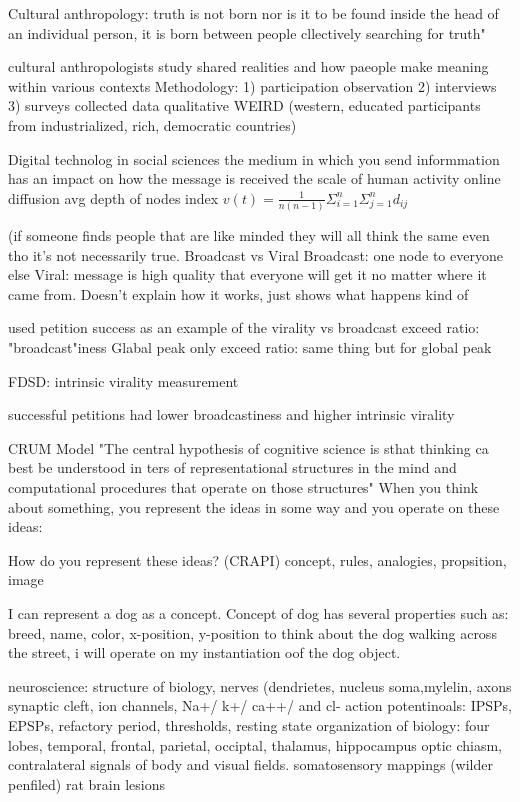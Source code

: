\documentclass{article}
\begin{document}
Cultural anthropology: truth is not born nor is it to be found inside the head of an individual person, it is born between people cllectively searching for truth" 

cultural anthropologists study shared realities and how paeople make meaning within various contexts
Methodology: 1) participation observation 2) interviews 3) surveys 
collected data qualitative
WEIRD (western, educated participants from industrialized, rich, democratic countries) 

Digital technolog in social sciences 
the medium in which you send informmation has an impact on how the message is received
the scale of human activity
online diffusion
avg depth of nodes index
$v(t) = \frac{1}{n(n-1)} \Sigma_{i = 1}^n \Sigma_{j = 1}^n d_{ij}$

(if someone finds people that are like minded they will all think the same even tho it's not necessarily true. 
Broadcast vs Viral
Broadcast: one node to everyone else
Viral: message is high quality that everyone will get it no matter where it came from. 
Doesn't explain how it works, just shows what happens kind of

used petition success as an example of the virality vs broadcast
exceed ratio: "broadcast"iness
Glabal peak only exceed ratio: same thing but for global peak

FDSD: intrinsic virality measurement

successful petitions had lower broadcastiness and higher intrinsic virality

CRUM Model 
"The central hypothesis of cognitive science is sthat thinking ca best be understood in ters of representational structures in the mind and computational procedures that operate on those structures" 
When you think about something, you represent the ideas in some way and you operate on these ideas: 

How do you represent these ideas? (CRAPI) 
concept, rules, analogies, propsition, image


I can represent a dog as a concept. Concept of dog has several properties such as: breed, name, color, x-position, y-position
to think about the dog walking across the street, i will operate on my instantiation oof the dog object. 

neuroscience: 
structure of biology, nerves (dendrietes, nucleus soma,mylelin, axons
synaptic cleft, ion channels, Na+/ k+/ ca++/ and cl- 
action potentinoals: IPSPs, EPSPs, refactory period, thresholds, resting state
organization of biology: four lobes, temporal, frontal, parietal, occiptal, thalamus, hippocampus
optic chiasm, contralateral signals of body and visual fields. 
somatosensory mappings (wilder penfiled) 
rat brain lesions 
\end{document}
